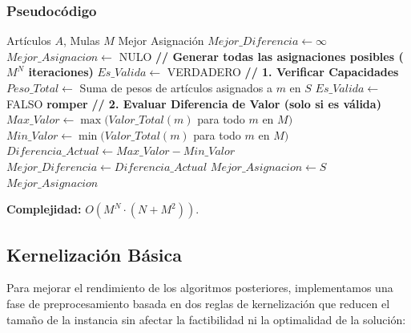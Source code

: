 \documentclass[12pt, a4paper]{article}
\begin{document}
    \subsubsection{Pseudocódigo}
    \begin{algorithm}[H]
        \caption{Fuerza Bruta para Transporte Discreto}
        \begin{algorithmic}[1]
            \Require Artículos $A$, Mulas $M$
            \Ensure Mejor Asignación
            \State $Mejor\_Diferencia \gets \infty$
            \State $Mejor\_Asignacion \gets$ NULO
            \State
            \State \textbf{// Generar todas las asignaciones posibles ($M^N$ iteraciones)}
                \State $Es\_Valida \gets$ VERDADERO
                \State
                \State \textbf{// 1. Verificar Capacidades}
                    \State $Peso\_Total \gets$ Suma de pesos de artículos asignados a $m$ en $S$
                        \State $Es\_Valida \gets$ FALSO
                        \State \textbf{romper}
                    \EndIf
                \EndFor
                \State
                \State \textbf{// 2. Evaluar Diferencia de Valor (solo si es válida)}
                    \State $Max\_Valor \gets \max(Valor\_Total(m)$ para todo $m$ en $M)$
                    \State $Min\_Valor \gets \min(Valor\_Total(m)$ para todo $m$ en $M)$
                    \State $Diferencia\_Actual \gets Max\_Valor - Min\_Valor$
                    \State
                        \State $Mejor\_Diferencia \gets Diferencia\_Actual$
                        \State $Mejor\_Asignacion \gets S$
                    \EndIf
                \EndIf
            \EndFor
            \State
            \State \Return $Mejor\_Asignacion$
        \end{algorithmic}
    \end{algorithm}
    \textbf{Complejidad:} $O(M^N \cdot (N + M^2))$.

    \subsection{Kernelización Básica}
    Para mejorar el rendimiento de los algoritmos posteriores, implementamos una fase de preprocesamiento basada en dos reglas de kernelización que reducen el tamaño de la instancia sin afectar la factibilidad ni la optimalidad de la solución:
\end{document}
